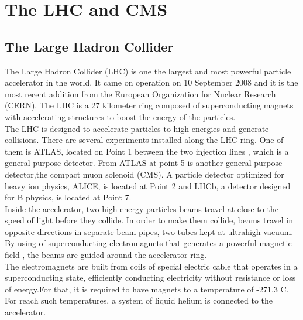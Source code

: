 \chapter{The LHC and CMS}

\section{The Large Hadron Collider}
\begin{linenumbers}
The Large Hadron Collider (LHC) is one the  largest and most powerful particle accelerator in the world. It came on operation on 10 September 2008 and it is the most recent addition from the  European Organization for Nuclear Research (CERN).  The LHC is a 27 kilometer ring composed of  superconducting magnets with accelerating structures to boost the energy of the particles. \\

The LHC is designed to accelerate particles to high energies and generate collisions. There are several
experiments installed along the LHC ring. One of them is ATLAS, located on Point 1 between the two injection lines , which is a general purpose detector. From ATLAS at point 5 is another general purpose detector,the compact muon solenoid  (CMS). A particle detector optimized for heavy ion physics, ALICE, is located at Point 2 and LHCb, a detector designed for B physics, is located at Point 7.\cite{cern1,cern2}
\\

Inside the accelerator, two high energy particles beams travel at
close to the speed of light before they collide. 
In order to make them collide, beams travel in opposite directions in separate beam pipes, 
two tubes kept at ultrahigh vacuum. 
By using of superconducting electromagnets that generates a powerful magnetic field , the beams are guided around the accelerator ring. \\
The electromagnets are built from coils of special electric cable that operates in a superconducting state, efficiently conducting electricity without resistance or loss of energy.For that, it is required to have  magnets to a temperature of  $‑271.3$ C. 
For reach such temperatures, a system of liquid helium is connected to the accelerator.\cite{cern2}


\end{linenumbers}
